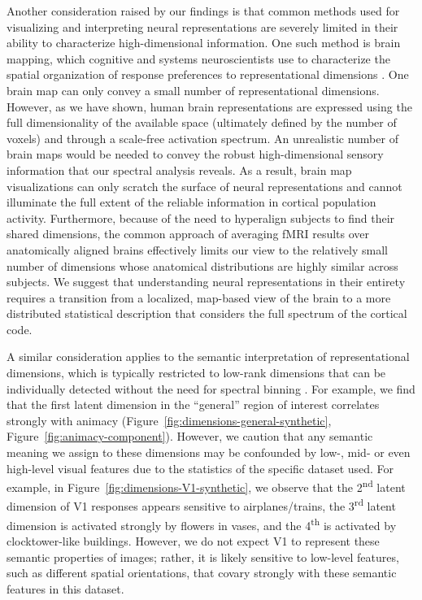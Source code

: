 \documentclass[10pt]{article}
\begin{document}
Another consideration raised by our findings is that common methods used for visualizing and interpreting neural representations are severely limited in their ability to characterize high-dimensional information. One such method is brain mapping, which cognitive and systems neuroscientists use to characterize the spatial organization of response preferences to representational dimensions \autocite{Huth2012,Bao2020,Tarhan2020,Hebart2023,Contier2024}. One brain map can only convey a small number of representational dimensions. However, as we have shown, human brain representations are expressed using the full dimensionality of the available space (ultimately defined by the number of voxels) and through a scale-free activation spectrum. An unrealistic number of brain maps would be needed to convey the robust high-dimensional sensory information that our spectral analysis reveals. As a result, brain map visualizations can only scratch the surface of neural representations and cannot illuminate the full extent of the reliable information in cortical population activity. Furthermore, because of the need to hyperalign subjects to find their shared dimensions, the common approach of averaging fMRI results over anatomically aligned brains effectively limits our view to the relatively small number of dimensions whose anatomical distributions are highly similar across subjects. We suggest that understanding neural representations in their entirety requires a transition from a localized, map-based view of the brain to a more distributed statistical description that considers the full spectrum of the cortical code.

A similar consideration applies to the semantic interpretation of representational dimensions, which is typically restricted to low-rank dimensions that can be individually detected without the need for spectral binning \autocite{Huth2012,Khosla2022,Tarhan2020,Hebart2023}. For example, we find that the first latent dimension in the ``general'' region of interest correlates strongly with animacy (Figure~\ref{fig:dimensions-general-synthetic}, Figure~\ref{fig:animacy-component}). However, we caution that any semantic meaning we assign to these dimensions may be confounded by low-, mid- or even high-level visual features due to the statistics of the specific dataset used. For example, in Figure~\ref{fig:dimensions-V1-synthetic}, we observe that the 2\textsuperscript{nd} latent dimension of V1 responses appears sensitive to airplanes/trains, the 3\textsuperscript{rd} latent dimension is activated strongly by flowers in vases, and the 4\textsuperscript{th} is activated by clocktower-like buildings. However, we do not expect V1 to represent these semantic properties of images; rather, it is likely sensitive to low-level features, such as different spatial orientations, that covary strongly with these semantic features in this dataset.
\end{document}
